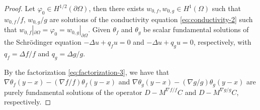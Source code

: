 \documentclass[12pt]{article}
\begin{document}
\begin{proof}
Let $\varphi_0\in H^{1/2}(\partial\Omega)$, then there exists $w_{0,f}, w_{0,g}\in H^1(\Omega)$ such that $w_{0,f}/f$, $w_{0,g}/g$ are solutions of the conductivity equation \eqref{eq:conductivity-2} such that $w_{0,f}|_{\partial\Omega}=\varphi_0=w_{0,g}|_{\partial\Omega}$. Given $\theta_f$ and $\theta_g$ be scalar fundamental solutions of the Schr\"{o}dinger equation $-\Delta u+q_f u=0$ and $-\Delta u+q_g u=0$, respectively, with $q_f=\Delta f/f$ and $q_g=\Delta g/g$. 

By the factorization \eqref{eq:factorization-3}, we have that $\nabla \theta_f(y-x)-(\nabla f/f)\theta_f(y-x)$ and $\nabla \theta_g(y-x)-(\nabla g/g)\theta_g(y-x)$ are purely fundamental solutions of the operator $D-M^{\nabla f/f}C$ and $D-M^{\nabla g/g}C$, respectively.


\end{proof}
\end{document}
